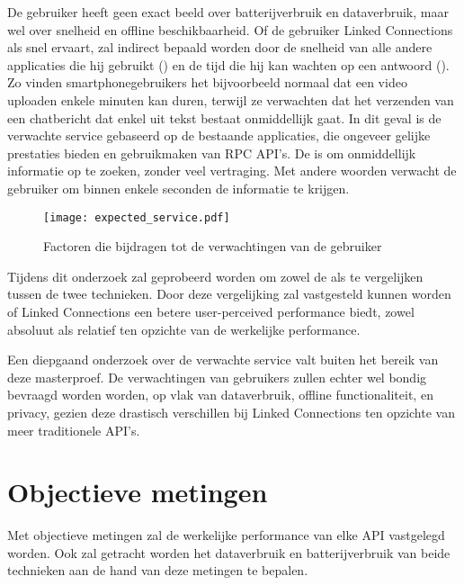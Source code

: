 De gebruiker heeft geen exact beeld over batterijverbruik en dataverbruik, maar wel over snelheid en offline beschikbaarheid. Of de gebruiker Linked Connections als snel ervaart, zal indirect bepaald worden door de snelheid van alle andere applicaties die hij gebruikt () en de tijd die hij kan wachten op een antwoord (). Zo vinden smartphonegebruikers het bijvoorbeeld normaal dat een video uploaden enkele minuten kan duren, terwijl ze verwachten dat het verzenden van een chatbericht dat enkel uit tekst bestaat onmiddellijk gaat. In dit geval is de verwachte service gebaseerd op de bestaande applicaties, die ongeveer gelijke prestaties bieden en gebruikmaken van RPC API's. De  is om onmiddellijk informatie op te zoeken, zonder veel vertraging. Met andere woorden verwacht de gebruiker om binnen enkele seconden de informatie te krijgen.

\begin{figure}[h]
	\centering
	\texttt{[image: expected\_service.pdf]}
	\caption[Factoren die bijdragen tot de verwachtingen van de gebruiker]{Factoren die bijdragen tot de verwachtingen van de gebruiker}
	\label{fig:expectedserviceperceivedservice}
\end{figure}

Tijdens dit onderzoek zal geprobeerd worden om zowel de  als  te vergelijken tussen de twee technieken. Door deze vergelijking zal vastgesteld kunnen worden of Linked Connections een betere user-perceived performance biedt, zowel absoluut als relatief ten opzichte van de werkelijke performance.

Een diepgaand onderzoek over de verwachte service valt buiten het bereik van deze masterproef. De verwachtingen van gebruikers zullen echter wel bondig bevraagd worden worden, op vlak van dataverbruik, offline functionaliteit, en privacy, gezien deze drastisch verschillen bij Linked Connections ten opzichte van meer traditionele API's.

\section{Objectieve metingen}

Met objectieve metingen zal de werkelijke performance van elke API vastgelegd worden. Ook zal getracht worden het dataverbruik en batterijverbruik van beide technieken aan de hand van deze metingen te bepalen.

